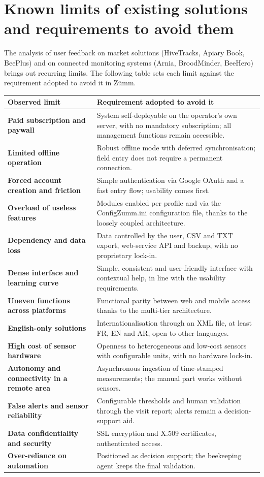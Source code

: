 \section{Known limits of existing solutions and requirements to avoid them}
The analysis of user feedback on market solutions (HiveTracks, Apiary Book,
BeePlus) and on connected monitoring systems (Arnia, BroodMinder, BeeHero)
brings out recurring limits. The following table sets each limit against the
requirement adopted to avoid it in Zümm.
\begin{xltabular}{\textwidth}{>{\bfseries}p{5.2cm} X}
\toprule
\textbf{Observed limit} & \textbf{Requirement adopted to avoid it} \\
\midrule
\endhead
Paid subscription and paywall & System self-deployable on the operator's own server, with no mandatory subscription; all management functions remain accessible. \\
Limited offline operation & Robust offline mode with deferred synchronisation; field entry does not require a permanent connection. \\
Forced account creation and friction & Simple authentication via Google OAuth and a fast entry flow; usability comes first. \\
Overload of useless features & Modules enabled per profile and via the ConfigZumm.ini configuration file, thanks to the loosely coupled architecture. \\
Dependency and data loss & Data controlled by the user, CSV and TXT export, web-service API and backup, with no proprietary lock-in. \\
Dense interface and learning curve & Simple, consistent and user-friendly interface with contextual help, in line with the usability requirements. \\
Uneven functions across platforms & Functional parity between web and mobile access thanks to the multi-tier architecture. \\
English-only solutions & Internationalisation through an XML file, at least FR, EN and AR, open to other languages. \\
High cost of sensor hardware & Openness to heterogeneous and low-cost sensors with configurable units, with no hardware lock-in. \\
Autonomy and connectivity in a remote area & Asynchronous ingestion of time-stamped measurements; the manual part works without sensors. \\
False alerts and sensor reliability & Configurable thresholds and human validation through the visit report; alerts remain a decision-support aid. \\
Data confidentiality and security & SSL encryption and X.509 certificates, authenticated access. \\
Over-reliance on automation & Positioned as decision support; the beekeeping agent keeps the final validation. \\
\bottomrule
\end{xltabular}
